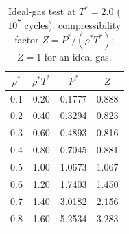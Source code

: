 \begin{table}[H]\centering\small
\caption{Ideal-gas test at $T^*=2.0$ ($10^7$ cycles): compressibility factor $Z=P^*/(\rho^*T^*)$; $Z=1$ for an ideal gas.}
\label{tab:ideal}\begin{tabular}{cccc}\hline $\rho^*$ & $\rho^*T^*$ & $P^*$ & $Z$ \\ \hline
0.1 & 0.20 & 0.1777 & 0.888 \\
0.2 & 0.40 & 0.3294 & 0.823 \\
0.3 & 0.60 & 0.4893 & 0.816 \\
0.4 & 0.80 & 0.7045 & 0.881 \\
0.5 & 1.00 & 1.0673 & 1.067 \\
0.6 & 1.20 & 1.7403 & 1.450 \\
0.7 & 1.40 & 3.0182 & 2.156 \\
0.8 & 1.60 & 5.2534 & 3.283 \\
\hline\end{tabular}\end{table}